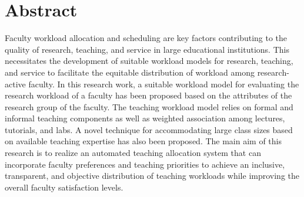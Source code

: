 
\chapter*{Abstract}

Faculty workload allocation and scheduling are key factors contributing to the quality of research, teaching, and service in large educational institutions. This necessitates the development of suitable workload models for research, teaching, and service to facilitate the equitable distribution of workload among research-active faculty. In this research work, a suitable workload model for evaluating the research workload of a faculty has been proposed based on the attributes of the research group of the faculty. The teaching workload model relies on formal and informal teaching components as well as weighted association among lectures, tutorials, and labs. A novel technique for accommodating large class sizes based on available teaching expertise has also been proposed. The main aim of this research is to realize an automated teaching allocation system that can incorporate faculty preferences and teaching priorities to achieve an inclusive, transparent, and objective distribution of teaching workloads while improving the overall faculty satisfaction levels.

